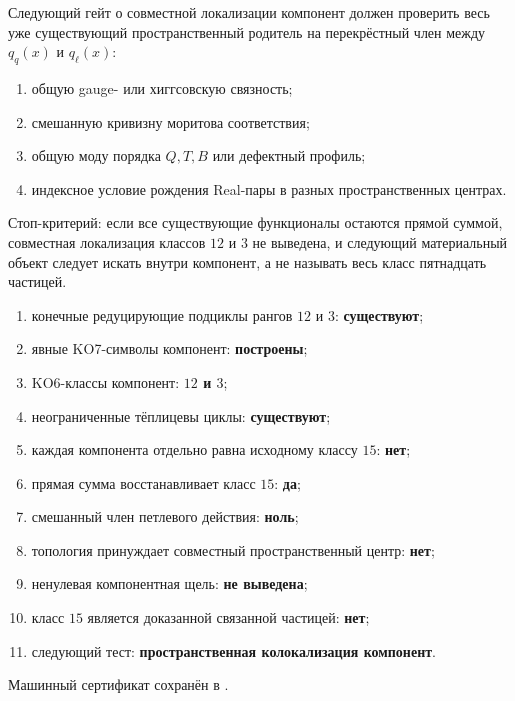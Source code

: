 Следующий гейт о совместной локализации компонент должен проверить весь
уже существующий пространственный родитель на
перекрёстный член между $q_q(x)$ и $q_\ell(x)$:
\begin{enumerate}
 \item общую gauge- или хиггсовскую связность;
 \item смешанную кривизну моритова соответствия;
 \item общую моду порядка $Q,T,B$ или дефектный профиль;
 \item индексное условие рождения Real-пары в разных пространственных
 центрах.
\end{enumerate}
Стоп-критерий: если все существующие функционалы остаются прямой суммой,
совместная локализация классов $12$ и $3$ не выведена, и следующий
материальный объект следует искать внутри компонент, а не называть весь
класс пятнадцать частицей.

\begin{protocol}
\begin{enumerate}
 \item конечные редуцирующие подциклы рангов $12$ и $3$:
 \textbf{существуют};
 \item явные KO7-символы компонент: \textbf{построены};
 \item KO6-классы компонент: \textbf{$12$ и $3$};
 \item неограниченные тёплицевы циклы: \textbf{существуют};
 \item каждая компонента отдельно равна исходному классу $15$:
 \textbf{нет};
 \item прямая сумма восстанавливает класс $15$: \textbf{да};
 \item смешанный член петлевого действия: \textbf{ноль};
 \item топология принуждает совместный пространственный центр:
 \textbf{нет};
 \item ненулевая компонентная щель: \textbf{не выведена};
 \item класс $15$ является доказанной связанной частицей: \textbf{нет};
 \item следующий тест: \textbf{пространственная колокализация компонент}.
\end{enumerate}
\end{protocol}

Машинный сертификат сохранён в
.

